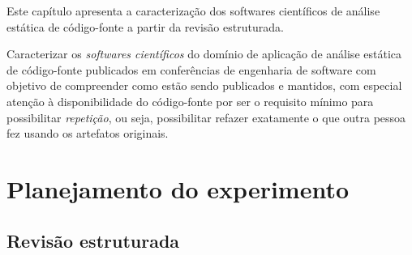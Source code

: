 {Este capítulo apresenta a caracterização dos softwares científicos de análise
estática de código-fonte a partir da revisão estruturada.}
\label{caracterizacao-ferramentas}

Caracterizar os {\it softwares científicos} do domínio de aplicação de análise
estática de código-fonte publicados em conferências de engenharia de software
com objetivo de compreender como estão sendo publicados e mantidos, com
especial atenção à disponibilidade do código-fonte por ser o requisito mínimo
para possibilitar {\it repetição}, ou seja, possibilitar refazer exatamente o
que outra pessoa fez usando os artefatos originais.



\section{Planejamento do experimento}

%
%

\subsection{Revisão estruturada}

